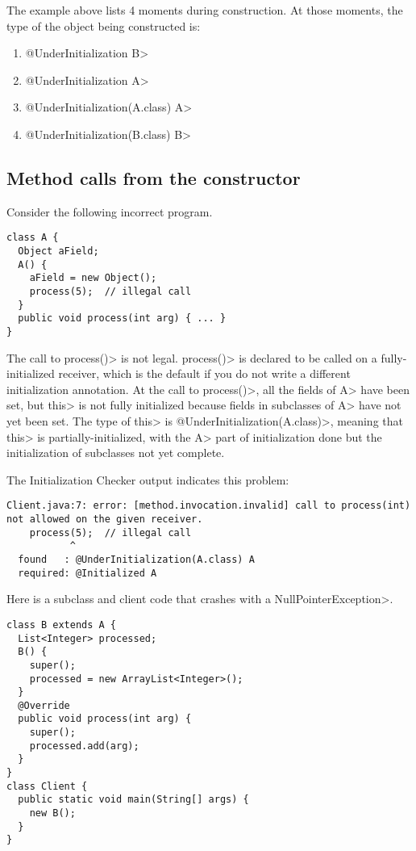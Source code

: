 The example above lists 4 moments during construction.  At those moments,
the type of the object being constructed is:

\begin{enumerate}
\item
  \<@UnderInitialization B>
\item
  \<@UnderInitialization A>
\item
  \<@UnderInitialization(A.class) A>
\item
  \<@UnderInitialization(B.class) B>
\end{enumerate}


\subsection{Method calls from the constructor\label{initialization-constructor}}

Consider the following incorrect program.

\begin{Verbatim}
class A {
  Object aField;
  A() {
    aField = new Object();
    process(5);  // illegal call
  }
  public void process(int arg) { ... }
}
\end{Verbatim}

The call to \<process()> is not legal.
\<process()> is declared to be called on a fully-initialized receiver, which is
the default if you do not write a different initialization annotation.
At the call to \<process()>, all the fields of \<A> have been set,
but \<this> is not fully initialized because fields in subclasses of \<A> have
not yet been set.  The type of \<this> is \<@UnderInitialization(A.class)>,
meaning that \<this> is partially-initialized, with the \<A> part of
initialization done but the initialization of subclasses not yet complete.

The Initialization Checker output indicates this problem:

\begin{Verbatim}
Client.java:7: error: [method.invocation.invalid] call to process(int) not allowed on the given receiver.
    process(5);  // illegal call
           ^
  found   : @UnderInitialization(A.class) A
  required: @Initialized A
\end{Verbatim}

Here is a subclass and client code that crashes with a \<NullPointerException>.

\begin{Verbatim}
class B extends A {
  List<Integer> processed;
  B() {
    super();
    processed = new ArrayList<Integer>();
  }
  @Override
  public void process(int arg) {
    super();
    processed.add(arg);
  }
}
class Client {
  public static void main(String[] args) {
    new B();
  }
}
\end{Verbatim}

